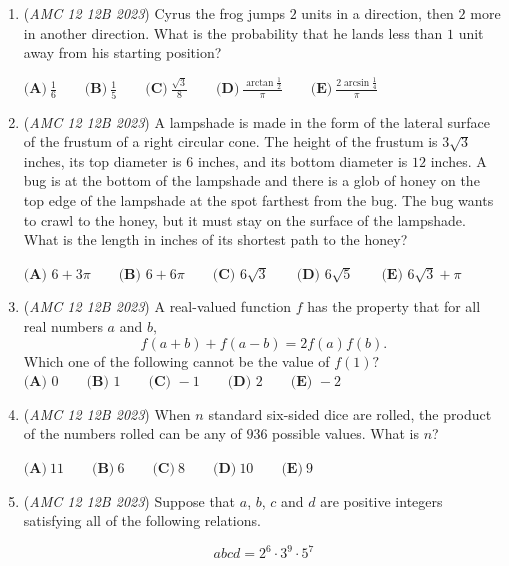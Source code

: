 \begin{enumerate}
 $\textbf{(A) } \frac{2}{3} \qquad \textbf{(B) } \frac{3}{10} \qquad \textbf{(C) } \frac{1}{2} \qquad \textbf{(D) } \frac{1}{3} \qquad \textbf{(E) } \frac{1}{4}$


	\item (\textit{AMC 12 12B 2023}) Cyrus the frog jumps $2$ units in a direction, then $2$ more in another direction. What is the probability that he lands less than $1$ unit away from his starting position?


 $\textbf{(A)}~\frac{1}{6}\qquad\textbf{(B)}~\frac{1}{5}\qquad\textbf{(C)}~\frac{\sqrt{3}}{8}\qquad\textbf{(D)}~\frac{\arctan \frac{1}{2}}{\pi}\qquad\textbf{(E)}~\frac{2\arcsin \frac{1}{4}}{\pi}$


	\item (\textit{AMC 12 12B 2023}) A lampshade is made in the form of the lateral surface of the frustum of a right circular cone. The height of the frustum is $3\sqrt3$ inches, its top diameter is $6$ inches, and its bottom diameter is $12$ inches. A bug is at the bottom of the lampshade and there is a glob of honey on the top edge of the lampshade at the spot farthest from the bug. The bug wants to crawl to the honey, but it must stay on the surface of the lampshade. What is the length in inches of its shortest path to the honey?


 $\textbf{(A) } 6 + 3\pi\qquad \textbf{(B) }6 + 6\pi\qquad \textbf{(C) } 6\sqrt3 \qquad \textbf{(D) } 6\sqrt5 \qquad \textbf{(E) } 6\sqrt3 + \pi$


	\item (\textit{AMC 12 12B 2023}) A real-valued function $f$ has the property that for all real numbers $a$ and $b,$
 \[f(a + b)  + f(a - b) = 2f(a) f(b).\]Which one of the following cannot be the value of $f(1)?$
$\textbf{(A) } 0 \qquad \textbf{(B) } 1 \qquad \textbf{(C) } -1 \qquad \textbf{(D) } 2 \qquad \textbf{(E) } -2$


	\item (\textit{AMC 12 12B 2023}) When $n$ standard six-sided dice are rolled, the product of the numbers rolled can be any of $936$ possible values. What is $n$?


 $\textbf{(A)}~11\qquad\textbf{(B)}~6\qquad\textbf{(C)}~8\qquad\textbf{(D)}~10\qquad\textbf{(E)}~9$


	\item (\textit{AMC 12 12B 2023}) Suppose that $a$, $b$, $c$ and $d$ are positive integers satisfying all of the following relations.


 
 \[abcd=2^6\cdot 3^9\cdot 5^7\]


\end{enumerate}
